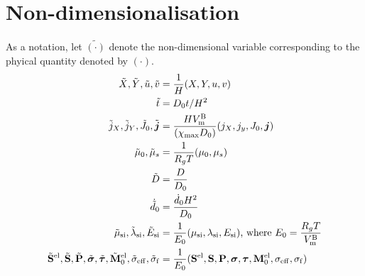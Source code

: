 \section{Non-dimensionalisation}\label{section:nonDim}
As a notation, let $\tilde{(\cdot)}$ denote the non-dimensional variable corresponding to the phyical quantity denoted by $(\cdot)$.
\begin{align}
    \tilde{X}, \tilde{Y}, \tilde{u}, \tilde{v} &= \frac{1}{H}(X, Y, u, v) \\
    \tilde{t} &= D_0 t/H^2 \\
    \tilde{j}_X, \tilde{j}_Y, \tilde{J}_0, \tilde{\bm{j}} &=  \frac{H V_{\rm{m}}^{\rm{B}}}{(\chi_{{\rm{max}}} D_0)} (j_X, j_y, J_0, \bm{j}) \\
     \tilde{\mu}_0, \tilde{\mu}_s &= \frac{1}{R_g T}(\mu_0, \mu_s) \\
     \tilde{D} &= \frac{D}{D_0} \\
     \dot{\tilde{d}}_{0} &= \frac{{\dot{d}}_0 H^2}{D_0} \\
     \tilde{\mu}_{\text{si}}, \tilde{\lambda}_{\text{si}}, \tilde{E}_{\text{si}} &= \frac{1}{E_0} (\mu_{\text{si}}, \lambda_{\text{si}}, E_{\text{si}}) \text{, where }  E_0 = \frac{R_g T}{V_{\rm{m}}^{\rm{B}}} \\
     \tilde{\mathbf{S}}^{{\rm{el}}}, \tilde{\mathbf{S}}, \tilde{\mathbf{P}}, \tilde{\bm{\sigma}}, \tilde{\bm{\tau}}, \tilde{\mathbf{M}}^{{\rm{el}}}_{0}, \tilde{\sigma}_{\rm{eff}}, \tilde{\sigma}_{\rm{f}} &= \frac{1}{E_0}(\mathbf{S}^{{\rm{el}}}, \mathbf{S}, \mathbf{P}, \bm{\sigma}, \bm{\tau}, \mathbf{M}^{{\rm{el}}}_{0}, \sigma_{\rm{eff}}, \sigma_{\rm{f}})
\end{align}

